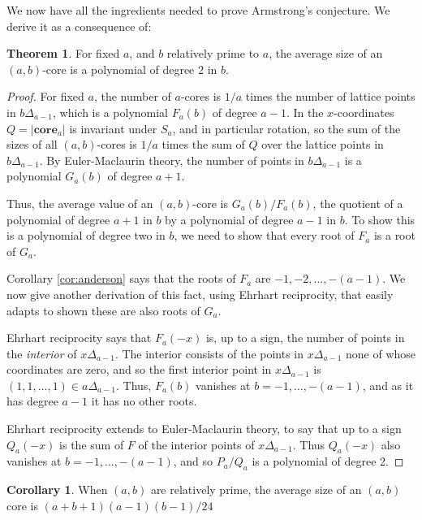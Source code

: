 \documentclass{amsart}[12pt]
\theoremstyle{definition}
\newtheorem{theorem}[dummy]{Theorem}
\newtheorem{corollary}[dummy]{Corollary}
\newcommand{\core}{\mathbf{core}}
\begin{document}
We now have all the ingredients needed to prove Armstrong's conjecture.  We derive it as a consequence of:

\begin{theorem} \label{thm:polynomial}
For fixed $a$, and $b$ relatively prime to $a$,  the average size of an $(a,b)$-core is a polynomial of degree 2 in $b$.
\end{theorem}

\begin{proof}
For fixed $a$, the number of $a$-cores is $1/a$ times the
number of lattice points in $b\Delta_{a-1}$, which is a polynomial
$F_a(b)$ of degree $a-1$.  In the $x$-coordinates $Q=|\core_a|$
is invariant under $S_a$, and in particular rotation, so the sum of the sizes of all $(a,b)$-cores is $1/a$ times the sum of $Q$ over the lattice points in $b\Delta_{a-1}$.   By Euler-Maclaurin theory, the number of points in $b\Delta_{a-1}$ is a polynomial $G_a(b)$ of degree $a+1$.

Thus, the average value of an $(a,b)$-core is $G_a(b)/F_a(b)$, the quotient of a polynomial of degree $a+1$ in $b$ by a polynomial of degree $a-1$ in $b$.  To show this is a polynomial of degree two in $b$, we need to show that every root of $F_a$ is a root of $G_a$.

Corollary \ref{cor:anderson} says that the roots of $F_a$ are $-1,
-2,\dots, -(a-1)$.  We now give another derivation of this fact, using Ehrhart reciprocity, that easily adapts to shown these are also roots of $G_a$. 

Ehrhart reciprocity says that $F_a(-x)$ is, up to a sign, the number of
points in the \emph{interior} of $x\Delta_{a-1}$.  The interior
consists of the points in $x\Delta_{a-1}$ none of whose coordinates
are zero, and so the first interior point in $x\Delta_{a-1}$ is  $(1,1,\dots,1)\in a\Delta_{a-1}$.   Thus, $F_a(b)$ vanishes at $b=-1,\dots, -(a-1)$, and as it has degree $a-1$ it has no other roots.

Ehrhart reciprocity extends to Euler-Maclaurin theory, to say that up to a sign $Q_a(-x)$ is the sum of $F$ of the interior points of
$x\Delta_{a-1}$. Thus $Q_a(-x)$ also vanishes at
$b=-1,\dots,-(a-1)$, and so $P_a/Q_a$ is a polynomial of degree 2.

\end{proof}


\begin{corollary} \label{cor:averagesize}
When $(a,b)$ are relatively prime, the average size of an $(a,b)$ core is $(a+b+1)(a-1)(b-1)/24$
\end{corollary}
\end{document}
